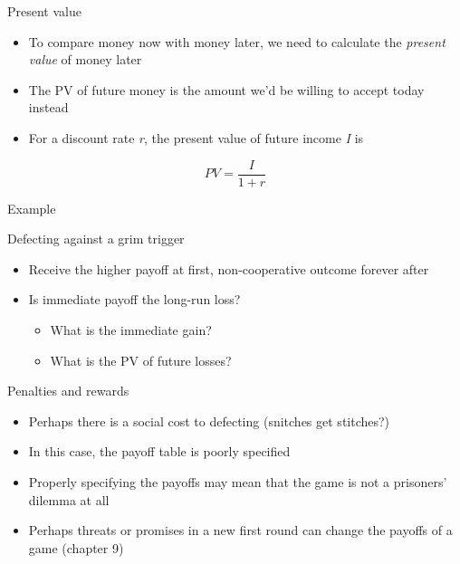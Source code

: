 \documentclass[10pt]{beamer}
\begin{document}
\begin{frame}[label={sec:org1ee58e9}]{}
\alert{Present value}
\begin{itemize}
\item To compare money now with money later, we need to calculate the \emph{present value} of money later
\item The PV of future money is the amount we'd be willing to accept today instead
\item For a discount rate \emph{r}, the present value of future income \emph{I} is
\end{itemize}

$$PV = \dfrac{I}{1+r}$$
\end{frame}

\begin{frame}[label={sec:org0492365}]{Example}
\end{frame}

\begin{frame}[label={sec:org5df0f40}]{}
\alert{Defecting against a grim trigger}
\begin{itemize}
\item Receive the higher payoff at first, non-cooperative outcome forever after
\item Is immediate payoff the long-run loss?
\begin{itemize}
\item What is the immediate gain?
\item What is the PV of future losses?
\end{itemize}
\end{itemize}
\end{frame}


\begin{frame}[label={sec:orgcf27c4b}]{}
\alert{Penalties and rewards}
\begin{itemize}
\item Perhaps there is a social cost to defecting (snitches get stitches?)
\item In this case, the payoff table is poorly specified
\item Properly specifying the payoffs may mean that the game is not a prisoners' dilemma at all
\item Perhaps threats or promises in a new first round can change the payoffs of a game (chapter 9)
\end{itemize}
\end{frame}
\end{document}
